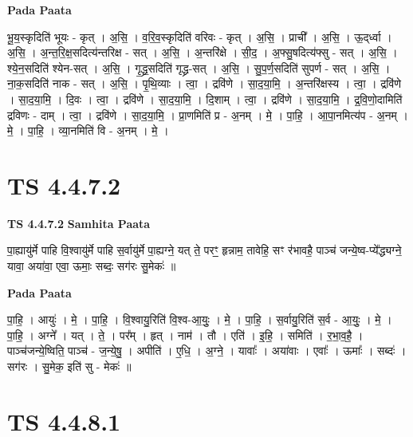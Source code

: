 \documentclass[17pt]{extarticle}
\begin{document}
\textbf{Pada Paata} \newline

भू॒य॒स्कृदिति॑ भूयः - कृत् । अ॒सि॒ । व॒रि॒व॒स्कृदिति॑ वरिवः - कृत् । अ॒सि॒ । प्राची᳚ । अ॒सि॒ । ऊ॒द्‌र्ध्वा । अ॒सि॒ । अ॒न्त॒रि॒क्ष॒सदित्य॑न्तरिक्ष - सत् । अ॒सि॒ । अ॒न्तरि॑क्षे । सी॒द॒ । अ॒फ्सु॒षदित्य॑फ्सु - सत् । अ॒सि॒ । श्ये॒न॒सदिति॑ श्येन-सत् । अ॒सि॒ । गृ॒द्ध्र॒सदिति॑ गृद्ध्र-सत् । अ॒सि॒ । सु॒प॒र्ण॒सदिति॑ सुपर्ण - सत् । अ॒सि॒ । ना॒क॒सदिति॑ नाक - सत् । अ॒सि॒ । पृ॒थि॒व्याः । त्वा॒ । द्रवि॑णे । सा॒द॒या॒मि॒ । अ॒न्तरि॑क्षस्य । त्वा॒ । द्रवि॑णे । सा॒द॒या॒मि॒ । दि॒वः । त्वा॒ । द्रवि॑णे । सा॒द॒या॒मि॒ । दि॒शाम् । त्वा॒ । द्रवि॑णे । सा॒द॒या॒मि॒ । द्र॒वि॒णो॒दामिति॑ द्रविणः - दाम् । त्वा॒ । द्रवि॑णे । सा॒द॒या॒मि॒ । प्रा॒णमिति॑ प्र - अ॒नम् । मे॒ । पा॒हि॒ । आ॒पा॒नमित्य॑प - अ॒नम् । मे॒ । पा॒हि॒ । व्या॒नमिति॑ वि - अ॒नम् । मे॒ ।  \newline





\section{ TS 4.4.7.2 }

\textbf{TS 4.4.7.2 } \newline
\textbf{Samhita Paata} \newline

पा॒ह्यायु॑र्मे पाहि वि॒श्वायु॑र्मे पाहि स॒र्वायु॑र्मे पा॒ह्यग्ने॒ यत् ते॒ परꣳ॒॒ हृन्नाम॒ तावेहि॒ सꣳ र॑भावहै॒ पाञ्च॑ जन्ये॒ष्व-प्ये᳚द्ध्यग्ने॒ यावा॒ अया॑वा॒ एवा॒ ऊमाः॒ सब्दः॒ सग॑रः सु॒मेकः॑ ॥ \newline

\textbf{Pada Paata} \newline

पा॒हि॒ । आयुः॑ । मे॒ । पा॒हि॒ । वि॒श्वायु॒रिति॑ वि॒श्व-आ॒युः॒ । मे॒ । पा॒हि॒ । स॒र्वायु॒रिति॑ स॒र्व - आ॒युः॒ । मे॒ । पा॒हि॒ । अग्ने᳚ । यत् । ते॒ । पर᳚म् । हृत् । नाम॑ । तौ । एति॑ । इ॒हि॒ । समिति॑ । र॒भा॒व॒है॒ । पाञ्च॑जन्ये॒ष्विति॒ पाञ्च॑ - ज॒न्ये॒षु॒ । अपीति॑ । ए॒धि॒ । अ॒ग्ने॒ । यावाः᳚ । अया॑वाः । एवाः᳚ । ऊमाः᳚ । सब्दः॑ । सग॑रः । सु॒मेक॒ इति॑ सु - मेकः॑ ॥  \newline





\section{ TS 4.4.8.1 }
\end{document}
